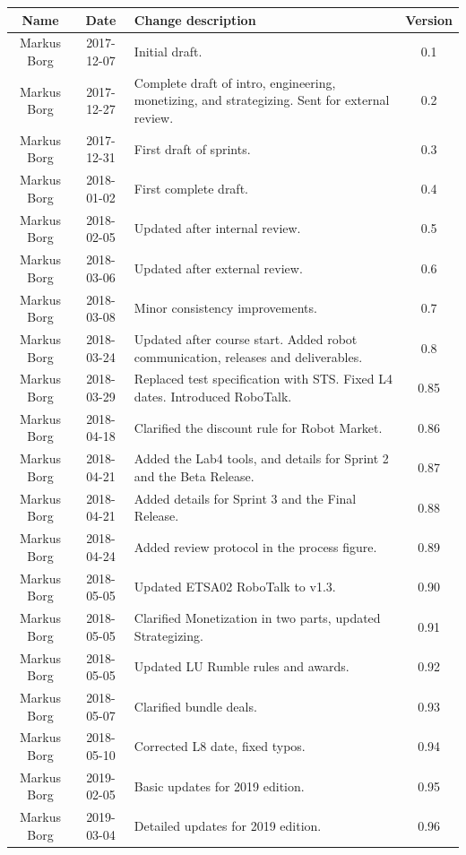 \documentclass{scrreprt}
\begin{document}
\begin{center}
    \begin{tabular}{|c|c|p{8cm}|c|}
        \hline
	    Name & Date & Change description & Version\\
        \hline
	    Markus Borg & 2017-12-07 & Initial draft. & 0.1\\
        \hline
        Markus Borg & 2017-12-27 & Complete draft of intro, engineering, monetizing, and strategizing. Sent for external review. & 0.2\\
        \hline
        Markus Borg & 2017-12-31 & First draft of sprints. & 0.3\\
        \hline
        Markus Borg & 2018-01-02 & First complete draft. & 0.4\\
        \hline
        Markus Borg & 2018-02-05 & Updated after internal review. & 0.5\\
        \hline
        Markus Borg & 2018-03-06 & Updated after external review. & 0.6\\
        \hline
        Markus Borg & 2018-03-08 & Minor consistency improvements. & 0.7\\
        \hline
        Markus Borg & 2018-03-24 & Updated after course start. Added robot communication, releases and deliverables. & 0.8\\
        \hline
        Markus Borg & 2018-03-29 & Replaced test specification with STS. Fixed L4 dates. Introduced RoboTalk. & 0.85\\
        \hline
        Markus Borg & 2018-04-18 & Clarified the discount rule for Robot Market. & 0.86\\
        \hline
        Markus Borg & 2018-04-21 & Added the Lab4 tools, and details for Sprint 2 and the Beta Release. & 0.87\\
        \hline
        Markus Borg & 2018-04-21 & Added details for Sprint 3 and the Final Release. & 0.88\\
        \hline
        Markus Borg & 2018-04-24 & Added review protocol in the process figure. & 0.89\\
        \hline
        Markus Borg & 2018-05-05 & Updated ETSA02 RoboTalk to v1.3. & 0.90\\
        \hline
        Markus Borg & 2018-05-05 & Clarified Monetization in two parts, updated Strategizing. & 0.91\\
        \hline
        Markus Borg & 2018-05-05 & Updated LU Rumble rules and awards. & 0.92\\
        \hline
        Markus Borg & 2018-05-07 & Clarified bundle deals. & 0.93\\
        \hline
        Markus Borg & 2018-05-10 & Corrected L8 date, fixed typos. & 0.94\\
        \hline
        Markus Borg & 2019-02-05 & Basic updates for 2019 edition. & 0.95\\
        \hline
        Markus Borg & 2019-03-04 & Detailed updates for 2019 edition. & 0.96\\
        \hline
    \end{tabular}
\end{center}
\end{document}
